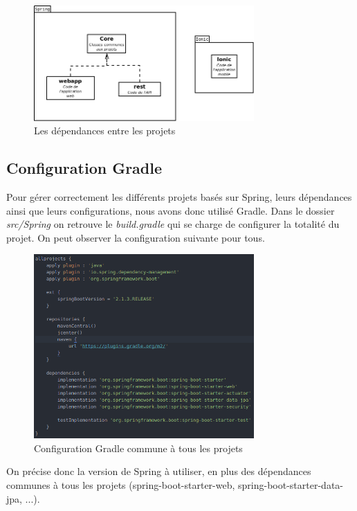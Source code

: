 			\begin{figure}[H]
				\centering\includegraphics[width=0.75\textwidth, keepaspectratio]{res/diag_projet.png}
				\caption{Les dépendances entre les projets}
			\end{figure}

		\subsection{Configuration Gradle}

			Pour gérer correctement les différents projets basés sur Spring, leurs dépendances ainsi que leurs configurations, nous avons donc utilisé Gradle. Dans le dossier \textit{src/Spring} on retrouve le \textit{build.gradle} qui se charge de configurer la totalité du projet. On peut observer la configuration suivante pour tous.

			\begin{figure}[H]
				\centering\includegraphics[width=0.75\textwidth, keepaspectratio]{res/gradle_allprojects.png}
				\caption{Configuration Gradle commune à tous les projets}
			\end{figure}

			On précise donc la version de Spring à utiliser, en plus des dépendances communes à tous les projets (spring-boot-starter-web, spring-boot-starter-data-jpa, ...).

